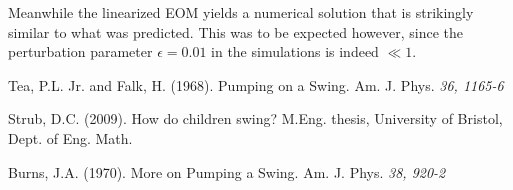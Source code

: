 \documentclass[11pt,letter, swedish, english,%
]{article}
\begin{document}
Meanwhile the linearized EOM yields a numerical solution that is
strikingly similar to what was predicted. This was to be expected
however, since the perturbation parameter $\epsilon=0.01$ in the
simulations is indeed $\ll1$.
















\begin{thebibliography}{9}

Tea, P.L. Jr. and Falk, H. (1968). Pumping on a Swing. Am. J. Phys. 
\textit{36, 1165-6}

Strub, D.C. (2009). How do children swing?  M.Eng. thesis, University
of Bristol, Dept. of Eng. Math.%

Burns, J.A. (1970). More on Pumping a Swing. Am. J. Phys. \textit{38, 920-2}
\end{thebibliography}
\end{document}
